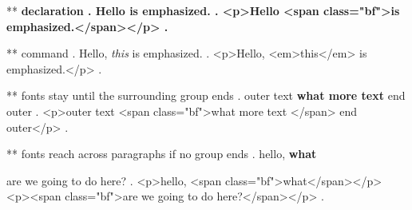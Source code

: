 ** \bfseries declaration
.
Hello \bfseries is emphasized.
.
<p>Hello <span class="bf">is emphasized.</span></p>
.

** \emph{} command
.
Hello, \emph{this} is emphasized.
.
<p>Hello, <em>this</em>​ is emphasized.</p>
.


** fonts stay until the surrounding group ends
.
outer { text \bfseries {what} more text } end outer
.
<p>outer  text <span class="bf">what more text </span> end outer</p>
.


** fonts reach across paragraphs if no group ends
.
hello, \bfseries what

are we going to do here?
.
<p>hello, <span class="bf">what</span></p>
<p><span class="bf">are we going to do here?</span></p>
.
